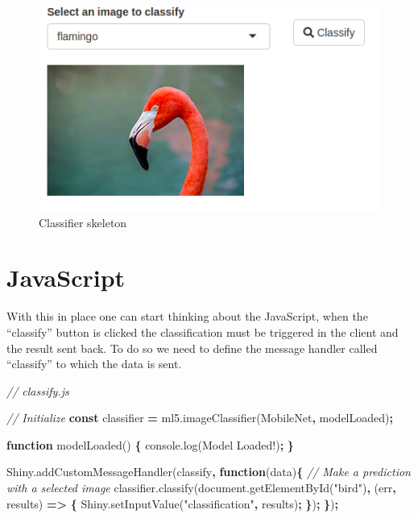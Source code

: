 \documentclass[
]{krantz}
\makeatletter
\newenvironment{Shaded}{\begin{snugshade}}{\end{snugshade}}
\newcommand{\AttributeTok}[1]{\textcolor[rgb]{0.61,0.61,0.61}{#1}}
\newcommand{\CommentTok}[1]{\textcolor[rgb]{0.37,0.37,0.37}{\textit{#1}}}
\newcommand{\KeywordTok}[1]{\textcolor[rgb]{0.27,0.27,0.27}{\textbf{#1}}}
\newcommand{\NormalTok}[1]{#1}
\newcommand{\OperatorTok}[1]{\textcolor[rgb]{0.43,0.43,0.43}{\textbf{#1}}}
\newcommand{\StringTok}[1]{\textcolor[rgb]{0.5,0.5,0.5}{#1}}
\newcommand{\VariableTok}[1]{\textcolor[rgb]{0,0,0}{#1}}
\newenvironment{kframe}{%
\medskip{}
\setlength{\fboxsep}{.8em}
 \def\at@end@of@kframe{}%
 \ifinner\ifhmode%
  \def\at@end@of@kframe{\end{minipage}}%
  \begin{minipage}{\columnwidth}%
 \fi\fi%
 \def\FrameCommand##1{\hskip\@totalleftmargin \hskip-\fboxsep
 \colorbox{shadecolor}{##1}\hskip-\fboxsep
     \hskip-\linewidth \hskip-\@totalleftmargin \hskip\columnwidth}%
 \MakeFramed {\advance\hsize-\width
   \@totalleftmargin\z@ \linewidth\hsize
   \@setminipage}}%
 {\par\unskip\endMakeFramed%
 \at@end@of@kframe}
\renewenvironment{Shaded}{\begin{kframe}}{\end{kframe}}
\makeatother
\begin{document}
\begin{figure}
\centering
\includegraphics{images/ml5-init.png}
\caption{Classifier skeleton}
\end{figure}

\hypertarget{javascript}{%
\section{JavaScript}\label{javascript}}

With this in place one can start thinking about the JavaScript, when the ``classify'' button is clicked the classification must be triggered in the client and the result sent back. To do so we need to define the message handler called ``classify'' to which the data is sent.

\begin{Shaded}
\begin{Highlighting}[]
\CommentTok{// classify.js}

\CommentTok{// Initialize }
\KeywordTok{const}\NormalTok{ classifier }\OperatorTok{=} \VariableTok{ml5}\NormalTok{.}\AttributeTok{imageClassifier}\NormalTok{(}\StringTok{\textquotesingle{}MobileNet\textquotesingle{}}\OperatorTok{,}\NormalTok{ modelLoaded)}\OperatorTok{;}

\KeywordTok{function} \AttributeTok{modelLoaded}\NormalTok{() }\OperatorTok{\{}
  \VariableTok{console}\NormalTok{.}\AttributeTok{log}\NormalTok{(}\StringTok{\textquotesingle{}Model Loaded!\textquotesingle{}}\NormalTok{)}\OperatorTok{;}
\OperatorTok{\}}

\VariableTok{Shiny}\NormalTok{.}\AttributeTok{addCustomMessageHandler}\NormalTok{(}\StringTok{\textquotesingle{}classify\textquotesingle{}}\OperatorTok{,} \KeywordTok{function}\NormalTok{(data)}\OperatorTok{\{}
  \CommentTok{// Make a prediction with a selected image}
  \VariableTok{classifier}\NormalTok{.}\AttributeTok{classify}\NormalTok{(}\VariableTok{document}\NormalTok{.}\AttributeTok{getElementById}\NormalTok{(}\StringTok{"bird"}\NormalTok{)}\OperatorTok{,}\NormalTok{ (err}\OperatorTok{,}\NormalTok{ results) }\KeywordTok{=>} \OperatorTok{\{}
    \VariableTok{Shiny}\NormalTok{.}\AttributeTok{setInputValue}\NormalTok{(}\StringTok{"classification"}\OperatorTok{,}\NormalTok{ results)}\OperatorTok{;}
  \OperatorTok{\}}\NormalTok{)}\OperatorTok{;}
\OperatorTok{\}}\NormalTok{)}\OperatorTok{;}
\end{Highlighting}
\end{Shaded}
\end{document}

